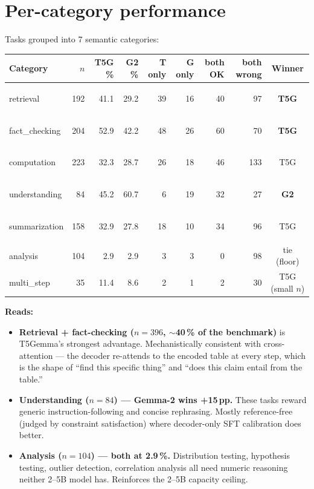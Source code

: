 \documentclass[11pt]{article}
\newcommand{\hl}[1]{\colorbox{hilite}{\strut #1}}
\begin{document}
\section*{Per-category performance}

Tasks grouped into 7 semantic categories:

\begin{tabular}{@{}lrrrrrrrc@{}}
\toprule
Category & $n$ & T5G \% & G2 \% & T only & G only & both OK & both wrong & Winner \\
\midrule
retrieval      & 192 & \hl{41.1} & 29.2 & 39 & 16 & 40 & 97 & \textbf{T5G} \\
fact\_checking & 204 & \hl{52.9} & 42.2 & 48 & 26 & 60 & 70 & \textbf{T5G} \\
computation    & 223 & \hl{32.3} & 28.7 & 26 & 18 & 46 & 133 & T5G \\
understanding  &  84 & 45.2 & \hl{60.7} &  6 & 19 & 32 & 27 & \textbf{G2} \\
summarization  & 158 & \hl{32.9} & 27.8 & 18 & 10 & 34 & 96 & T5G \\
analysis       & 104 &  2.9 &  2.9 &  3 &  3 &  0 & 98 & tie (floor) \\
multi\_step    &  35 & 11.4 &  8.6 &  2 &  1 &  2 & 30 & T5G (small $n$) \\
\bottomrule
\end{tabular}

\medskip

\textbf{Reads:}

\begin{itemize}
  \item \textbf{Retrieval + fact-checking ($n=396$, $\sim$40\,\% of the
        benchmark)} is T5Gemma's strongest advantage. Mechanistically
        consistent with cross-attention --- the decoder re-attends to the
        encoded table at every step, which is the shape of ``find this
        specific thing'' and ``does this claim entail from the table.''
  \item \textbf{Understanding ($n=84$) --- Gemma-2 wins +15\,pp.} These
        tasks reward generic instruction-following and concise rephrasing.
        Mostly reference-free (judged by constraint satisfaction) where
        decoder-only SFT calibration does better.
  \item \textbf{Analysis ($n=104$) --- both at 2.9\,\%.} Distribution
        testing, hypothesis testing, outlier detection, correlation
        analysis all need numeric reasoning neither 2--5B model has.
        Reinforces the 2--5B capacity ceiling.
\end{itemize}
\end{document}
